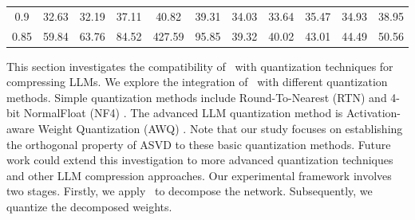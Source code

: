 \begin{table}[tb]
{\begin{tabular}{@{}ccccccccccc@{}}
\multicolumn{1}{c|}{0.9}         & 32.63 & 32.19                                                & 37.11                                                & 40.82  & \multicolumn{1}{c|}{39.31}                                                & 34.03 & 33.64                                                & 35.47                                                & 34.93 & 38.95                                                \\
\multicolumn{1}{c|}{0.85}        & 59.84 & 63.76                                                & 84.52                                                & 427.59 & \multicolumn{1}{c|}{95.85}                                                & 39.32 & 40.02                                                & 43.01                                                & 44.49 & 50.56                                                \\ \bottomrule
\end{tabular}
}
\end{table}

This section investigates the compatibility of \asvd~with quantization techniques for compressing LLMs. We explore the integration of \asvd~with different quantization methods. 
Simple quantization methods include Round-To-Nearest (RTN) and 4-bit NormalFloat (NF4) \citep{dettmers2023qlora}. The advanced LLM quantization method is Activation-aware Weight Quantization (AWQ) \citep{lin2023awq}. 
Note that our study focuses on establishing the orthogonal property of ASVD to these basic quantization methods. Future work could extend this investigation to more advanced quantization techniques and other LLM compression approaches.
Our experimental framework involves two stages. Firstly, we apply \asvd~to decompose the network. Subsequently, we quantize the decomposed weights. 

